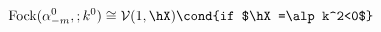 \begin{equation}
%
\mbox{Fock}(\alpha^{0}_{-m}, ;k^0) \cong {\cal V}(1, \hX) 
\cond{if $\hX=\alp k^2<0$}
\label{eq:verma}
%
\end{equation}

